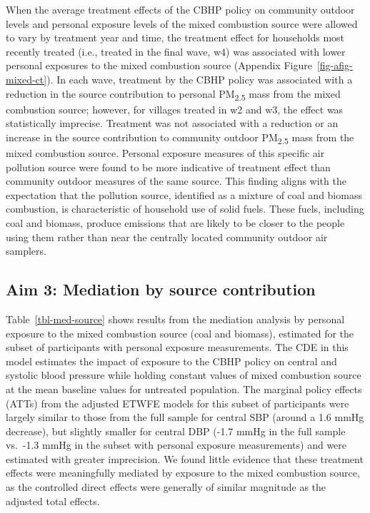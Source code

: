 \documentclass[
  letterpaper,
  DIV=11,
  numbers=noendperiod]{scrartcl}
\begin{document}
When the average treatment effects of the CBHP policy on community
outdoor levels and personal exposure levels of the mixed combustion
source were allowed to vary by treatment year and time, the treatment
effect for households most recently treated (i.e., treated in the final
wave, w4) was associated with lower personal exposures to the mixed
combustion source (Appendix Figure~\ref{fig-afig-mixed-ct}). In each
wave, treatment by the CBHP policy was associated with a reduction in
the source contribution to personal PM\textsubscript{2.5} mass from the
mixed combustion source; however, for villages treated in w2 and w3, the
effect was statistically imprecise. Treatment was not associated with a
reduction or an increase in the source contribution to community outdoor
PM\textsubscript{2.5} mass from the mixed combustion source. Personal
exposure measures of this specific air pollution source were found to be
more indicative of treatment effect than community outdoor measures of
the same source. This finding aligns with the expectation that the
pollution source, identified as a mixture of coal and biomass
combustion, is characteristic of household use of solid fuels. These
fuels, including coal and biomass, produce emissions that are likely to
be closer to the people using them rather than near the centrally
located community outdoor air samplers.

\subsection{Aim 3: Mediation by source
contribution}\label{aim-3-mediation-by-source-contribution}

Table~\ref{tbl-med-source} shows results from the mediation analysis by
personal exposure to the mixed combustion source (coal and biomass),
estimated for the subset of participants with personal exposure
measurements. The CDE in this model estimates the impact of exposure to
the CBHP policy on central and systolic blood pressure while holding
constant values of mixed combustion source at the mean baseline values
for untreated population. The marginal policy effects (ATTs) from the
adjusted ETWFE models for this subset of participants were largely
similar to those from the full sample for central SBP (around a 1.6 mmHg
decrease), but slightly smaller for central DBP (-1.7 mmHg in the full
sample vs.~-1.3 mmHg in the subset with personal exposure measurements)
and were estimated with greater imprecision. We found little evidence
that these treatment effects were meaningfully mediated by exposure to
the mixed combustion source, as the controlled direct effects were
generally of similar magnitude as the adjusted total effects.
\end{document}
